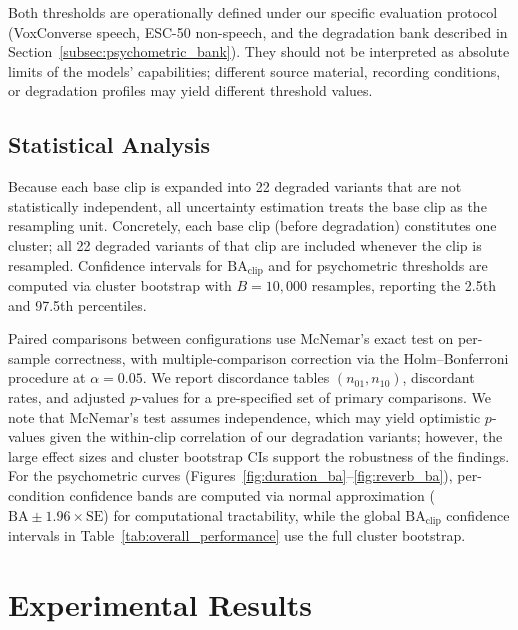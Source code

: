 \documentclass[11pt,a4paper]{article}
\begin{document}
Both thresholds are operationally defined under our specific evaluation protocol (VoxConverse speech, ESC-50 non-speech, and the degradation bank described in Section~\ref{subsec:psychometric_bank}). They should not be interpreted as absolute limits of the models' capabilities; different source material, recording conditions, or degradation profiles may yield different threshold values.

\subsection{Statistical Analysis}
\label{subsec:statistics}

Because each base clip is expanded into 22 degraded variants that are not statistically independent, all uncertainty estimation treats the base clip as the resampling unit. Concretely, each base clip (before degradation) constitutes one cluster; all 22 degraded variants of that clip are included whenever the clip is resampled. Confidence intervals for $\text{BA}_{\text{clip}}$ and for psychometric thresholds are computed via cluster bootstrap with $B = 10{,}000$ resamples, reporting the 2.5th and 97.5th percentiles.

Paired comparisons between configurations use McNemar's exact test on per-sample correctness, with multiple-comparison correction via the Holm--Bonferroni procedure at $\alpha = 0.05$. We report discordance tables $(n_{01}, n_{10})$, discordant rates, and adjusted $p$-values for a pre-specified set of primary comparisons. We note that McNemar's test assumes independence, which may yield optimistic $p$-values given the within-clip correlation of our degradation variants; however, the large effect sizes and cluster bootstrap CIs support the robustness of the findings. For the psychometric curves (Figures~\ref{fig:duration_ba}--\ref{fig:reverb_ba}), per-condition confidence bands are computed via normal approximation ($\text{BA} \pm 1.96 \times \text{SE}$) for computational tractability, while the global $\text{BA}_{\text{clip}}$ confidence intervals in Table~\ref{tab:overall_performance} use the full cluster bootstrap.


\section{Experimental Results}
\label{sec:results}
\end{document}

